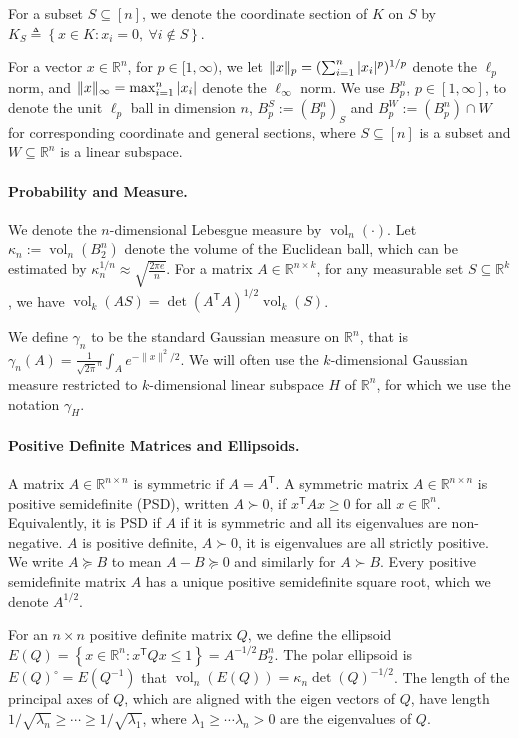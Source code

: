 \documentclass[11pt]{article}
\newcommand{\R}{{\mathbb{R}}}
\newcommand{\T}{\mathsf T}
\newcommand{\eqdef}{\triangleq}
\newcommand{\set}[1]{\left\{ #1 \right\}}
\DeclareMathOperator{\vol}{vol}
\DeclarePairedDelimiter\norm{\lVert}{\rVert}
\begin{document}
For a subset $S \subseteq [n]$, we denote the coordinate section of $K$ on $S$
by $K_S \eqdef \set{x \in K: x_i = 0, ~\forall i \notin S}$. 

For a vector $x \in \R^n$, for $p \in [1,\infty)$, we let $\norm{x}_p =
(\sum_{i=1}^n |x_i|^p)^{1/p}$ denote the $\ell_p$ norm, and $\norm{x}_\infty =
\max_{i=1}^n |x_i|$ denote the $\ell_\infty$ norm. We use $B_p^n$, $p \in
[1,\infty]$, to denote the unit $\ell_p$ ball in dimension $n$, $B_p^S :=
(B_p^n)_S$ and $B_p^W := (B_p^n) \cap W$ for corresponding coordinate and
general sections, where $S \subseteq [n]$ is a subset and $W \subseteq \R^n$ is
a linear subspace. 

\paragraph{\bf Probability and Measure.} We denote the $n$-dimensional Lebesgue
measure by $\vol_n(\cdot)$. Let $\kappa_n := \vol_n(B_2^n)$ denote the volume
of the Euclidean ball, which can be estimated by $\kappa_n^{1/n} \approx
\sqrt{\frac{2\pi e}{n}}$. For a matrix $A \in \R^{n \times k}$, for any
measurable set $S \subseteq \R^k$, we have $\vol_k(A S) = \det(A^\T A)^{1/2}
\vol_k(S)$.  

We define $\gamma_n$ to be the standard Gaussian measure on $\R^n$, that is
$\gamma_n(A) = \frac{1}{\sqrt{2\pi}^n} \int_A e^{-\|x\|^2/2}$. We will often use
the $k$-dimensional Gaussian measure restricted to $k$-dimensional linear
subspace $H$ of $\R^n$, for which we use the notation $\gamma_H$.

\paragraph{\bf Positive Definite Matrices and Ellipsoids.} A matrix $A \in \R^{n
\times n}$ is symmetric if $A = A^\T$. A symmetric matrix $A \in \R^{n \times
n}$ is positive semidefinite (PSD), written $A \succ 0$, if $x^\T A x \geq 0$
for all $x \in \R^n$. Equivalently, it is PSD if $A$ if it is symmetric and all
its eigenvalues are non-negative. $A$ is positive definite, $A \succ 0$, it is
eigenvalues are all strictly positive. We write $A \succeq B$ to mean $A-B
\succeq 0$ and similarly for $A \succ B$. Every positive semidefinite matrix $A$
has a unique positive semidefinite square root, which we denote $A^{1/2}$. 

For an $n \times n$ positive definite matrix $Q$, we define the ellipsoid $E(Q)
= \set{x \in \R^n: x^\T Q x \leq 1} = A^{-1/2} B_2^n$. The polar ellipsoid is
$E(Q)^\circ = E(Q^{-1})$ that $\vol_n(E(Q)) = \kappa_n \det(Q)^{-1/2}$. The
length of the principal axes of $Q$, which are aligned with the eigen vectors of
$Q$, have length $1/\sqrt{\lambda_n} \geq \cdots \geq 1/\sqrt{\lambda_1}$, where
$\lambda_1 \geq \cdots \lambda_n > 0$ are the eigenvalues of $Q$.   
\end{document}
